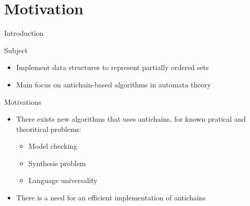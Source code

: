 \documentclass[10pt]{beamer}
\begin{document}
\section{Motivation}
\begin{frame}{Introduction}{}
    \begin{block}{Subject}
        \begin{itemize}
            \item Implement data structures to represent partially ordered sets
            \item Main focus on antichain-based algorithms in automata theory
        \end{itemize}
    \end{block}
    \begin{block}{Motivations}
        \begin{itemize}
            \item There exists new algorithms that uses antichains,
            for known pratical and theoritical problems:
            \begin{itemize}
                \item Model checking \cite{grumberg_improved_2007}
                \item Synthesis problem \cite{ltl_rea}
                \item Language universality \cite{AC_universality}
            \end{itemize}
            \item There is a need for an efficient implementation of antichains
        \end{itemize}
    \end{block}
\end{frame}
\end{document}
